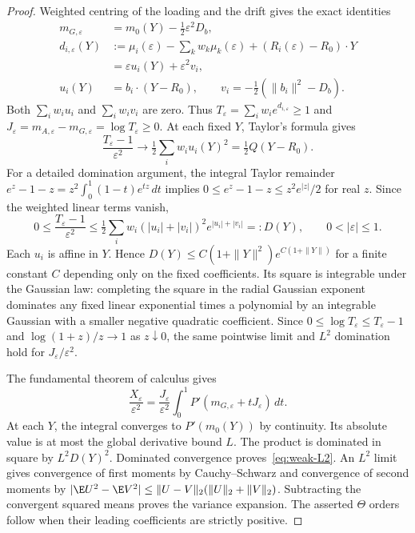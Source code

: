 \begin{proof}
Weighted centring of the loading and the drift gives the exact identities
\begin{align}
 m_{G,\varepsilon}
 &=m_0(Y)-\tfrac12\varepsilon^2D_b,\\
 d_{i,\varepsilon}(Y)
 &:=\mu_i(\varepsilon)-\sum_kw_k\mu_k(\varepsilon)
              +(R_i(\varepsilon)-R_0)\cdot Y\\
 &=\varepsilon u_i(Y)+\varepsilon^2v_i,\\
 u_i(Y)&=b_i\cdot(Y-R_0),\qquad
 v_i=-\tfrac12(\|b_i\|^2-D_b).
\end{align}
Both $\sum_iw_i u_i$ and $\sum_iw_i v_i$ are zero. Thus
$T_\varepsilon=\sum_iw_i e^{d_{i,\varepsilon}}\geq1$ and
$J_\varepsilon=m_{A,\varepsilon}-m_{G,\varepsilon}
=\log T_\varepsilon\geq0$.
At each fixed $Y$, Taylor's formula gives
\begin{equation}
 \frac{T_\varepsilon-1}{\varepsilon^2}
 \longrightarrow \tfrac12\sum_iw_i u_i(Y)^2
 =\tfrac12 Q(Y-R_0).
\end{equation}
For a detailed domination argument, the integral Taylor remainder
$e^z-1-z=z^2\int_0^1(1-t)e^{tz}\,dt$ implies
$0\leq e^z-1-z\leq z^2e^{|z|}/2$ for real $z$.
Since the weighted linear terms vanish,
\begin{equation}
 0\leq\frac{T_\varepsilon-1}{\varepsilon^2}
 \leq \tfrac12\sum_iw_i
       (|u_i|+|v_i|)^2e^{|u_i|+|v_i|}
 =:D(Y),\qquad0<|\varepsilon|\leq1.
\end{equation}
Each $u_i$ is affine in $Y$. Hence
$D(Y)\leq C(1+\|Y\|^2)e^{C(1+\|Y\|)}$ for a finite constant $C$
depending only on the fixed coefficients. Its square is integrable under
the Gaussian law: completing the square in the radial Gaussian exponent
dominates any fixed linear exponential times a polynomial by an integrable
Gaussian with a smaller negative quadratic coefficient.
Since $0\leq\log T_\varepsilon\leq T_\varepsilon-1$ and
$\log(1+z)/z\to1$ as $z\downarrow0$, the same pointwise limit and
$L^2$ domination hold for $J_\varepsilon/\varepsilon^2$.

The fundamental theorem of calculus gives
\begin{equation}
 \frac{X_\varepsilon}{\varepsilon^2}
 =\frac{J_\varepsilon}{\varepsilon^2}
   \int_0^1P'(m_{G,\varepsilon}+tJ_\varepsilon)\,dt.
\end{equation}
At each $Y$, the integral converges to $P'(m_0(Y))$ by continuity.
Its absolute value is at most the global derivative bound $L$.
The product is dominated in square by $L^2D(Y)^2$.
Dominated convergence proves~\eqref{eq:weak-L2}.
An $L^2$ limit gives convergence of first moments by
Cauchy--Schwarz and convergence of second moments by
$|\E U^2-\E V^2|\leq\|U-V\|_2(\|U\|_2+\|V\|_2)$.
Subtracting the convergent squared means proves the variance expansion.
The asserted $\Theta$ orders follow when their leading coefficients are
strictly positive.
\end{proof}

